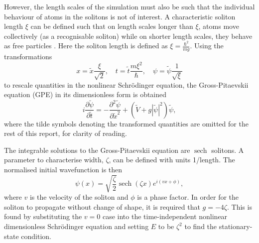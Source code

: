 \documentclass[10pt, twocolumn]{revtex4}    %
\DeclareMathOperator{\sech}{sech}		%
\providecommand{\e}[1]{\ensuremath{\times 10^{#1}}} %
\begin{document}
However, the length scales of the simulation must also be such that the individual behaviour of atoms in the solitons is not of interest. A characteristic soliton length $\xi$ can be defined such that on length scales longer than $\xi$, atoms move collectively (as a recognisable soliton) while on shorter length scales, they behave as free particles \cite{}. Here the soliton length is defined as $\xi = \frac{\hbar^2}{mg}$. Using the transformations 
\begin{equation} \label{transforms}
x = \tilde{x} \frac{\xi}{\sqrt{2}}, \quad		 t = \tilde{t} \frac{m \xi^2}{\hbar}, 	\quad \psi = \tilde{\psi} \frac{1}{\sqrt{\xi}}
\end{equation}
to rescale quantities in the nonlinear Schr\"{o}dinger equation, the Gross-Pitaevskii equation (GPE) in its dimensionless form is obtained \cite{Gross} \cite{Pitaevskii}
\begin{equation} \label{GPE}
i \frac{\partial \tilde{\psi}}{\partial \tilde{t}} = -\frac{\partial^2 \tilde{\psi}}{\partial \tilde{x}^2} + (\tilde{V}+g |\tilde{\psi}|^2) \tilde{\psi},
\end{equation}
where the tilde symbols denoting the transformed quantities are omitted for the rest of this report, for clarity of reading. 

The integrable solutions to the Gross-Pitaevskii equation are $\sech$ solitons. A parameter to characterise width, $\zeta$, can be defined with units 1/length. The normalised initial wavefunction is then 
\begin{equation} 
\psi(x) = \sqrt{\frac{\zeta}{2}} \sech{(\zeta x)} e^{i (v x + \phi)},
\end{equation}
where $v$ is the velocity of the soliton and $\phi$ is a phase factor. In order for the soliton to propagate without change of shape, it is required that $g=-4\zeta$. This is found by substituting the $v=0$ case into the time-independent nonlinear dimensionless Schr\"{o}dinger equation and setting $E$ to be $\zeta^2$ to find the stationary-state condition.  

\end{document}
